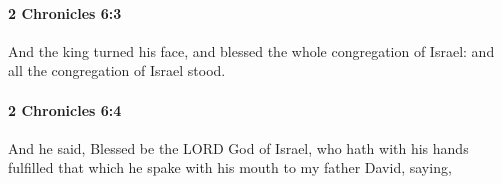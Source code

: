 		\paragraph{2 Chronicles 6:3} %
			\label{2CHRONICLES-6-3}

			And the king turned his face, and blessed the whole congregation of Israel: and all the congregation of Israel stood.


		\paragraph{2 Chronicles 6:4} %
			\label{2CHRONICLES-6-4}

			And he said, Blessed be the LORD God of Israel, who hath with his hands fulfilled that which he spake with his mouth to my father David, saying,


